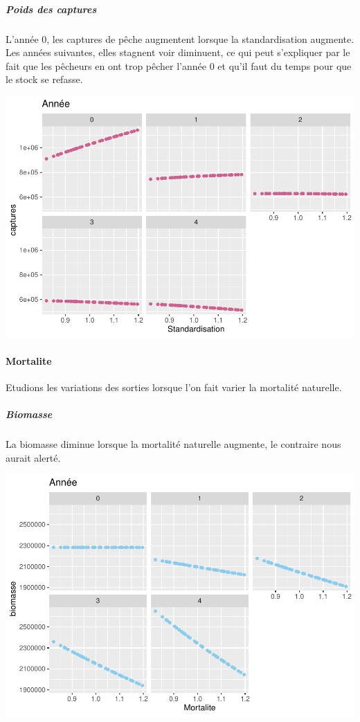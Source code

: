 \documentclass[
]{article}
\begin{document}
\hypertarget{poids-des-captures-2}{%
\subparagraph{Poids des captures}\label{poids-des-captures-2}}

L'année 0, les captures de pêche augmentent lorsque la standardisation
augmente. Les années suivantes, elles stagnent voir diminuent, ce qui
peut s'expliquer par le fait que les pêcheurs en ont trop pêcher l'année
0 et qu'il faut du temps pour que le stock se refasse.

\includegraphics{rapport_files/figure-latex/aq-1.pdf}

\hypertarget{mortalite}{%
\paragraph{Mortalite}\label{mortalite}}

Etudions les variations des sorties lorsque l'on fait varier la
mortalité naturelle.

\hypertarget{biomasse-4}{%
\subparagraph{Biomasse}\label{biomasse-4}}

La biomasse diminue lorsque la mortalité naturelle augmente, le
contraire nous aurait alerté.

\includegraphics{rapport_files/figure-latex/ag-1.pdf}
\end{document}
